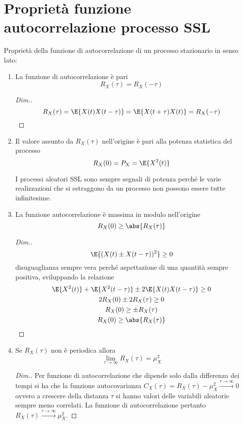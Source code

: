 \section{Proprietà funzione autocorrelazione processo SSL}
Proprietà della funzione di autocorrelazione di un processo stazionario in senso lato:
\begin{enumerate}
\item La funzione di autocorrelazione è pari
\[
	R_X(\tau)=R_X(-\tau)
\]
\begin{proof}[Dim.]
\[
	R_X(\tau)=\E{X(t)X(t-\tau)}=\E{X(t+\tau)X(t)}=R_X(-\tau)
\qedhere
\]
\end{proof}
\item Il valore assunto da $R_X(\tau)$ nell'origine è pari alla potenza statistica del processo
\[
	R_X(0)=P_X=\E{X^2(t)}
\]
\begin{nota}
	I processi aleatori SSL sono sempre segnali di potenza perché le varie realizzazioni che si estraggono da un processo non possono essere tutte infinitesime.
\end{nota}
\item La funzione autocorrelazione è massima in modulo nell'origine
\[
	R_X(0)\geq\abs{R_X(\tau)}
\]
\begin{proof}[Dim.]
\[
	\E{(X(t)\pm X(t-\tau))^2}\geq 0
\]
disuguaglianza sempre vera perché aspettazione di una quantità sempre positiva, sviluppando la relazione
\begin{gather*}
\E{X^2(t)}+\E{X^2(t-\tau)}\pm 2 \E{X(t)X(t-\tau)}\geq 0\\
2R_X(0)\pm 2R_X(\tau)\geq 0\\
R_X(0)\geq\pm R_X(\tau)\\
R_X(0)\geq\abs{R_X(\tau)}
\qedhere
\end{gather*}
\end{proof}
\item Se $R_X(\tau)$ non è periodica allora \begin{equation}
	\lim\limits_{\tau\to\infty}R_X(\tau)=\mu^2_X
\end{equation}
\begin{proof}[Dim.]
Per funzione di autocorrelazione che dipende solo dalla differenza dei tempi si ha che la funzione autocovarianza $C_X(\tau)=R_X(\tau)-\mu^2_X\xrightarrow{\tau\to\infty}0$ ovvero a crescere della distanza $\tau$ si hanno valori delle variabili aleatorie sempre meno correlati. La funzione di autocorrelazione pertanto $R_X(\tau)\xrightarrow{\tau\to\infty}\mu^2_X$.
\end{proof}
\end{enumerate}

